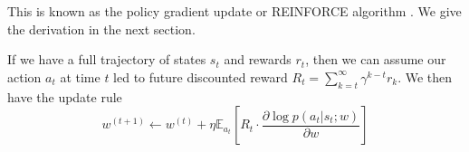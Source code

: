 \documentclass[11pt]{report}
\begin{document}
This is known as the policy gradient update or REINFORCE algorithm \citep{williams1992reinforce}. We give the derivation in the next section.

If we have a full trajectory of states $s_t$ and rewards $r_t$, then we can assume our action $a_t$ at time $t$ led to future discounted reward $R_t = \sum_{k=t}^\infty \gamma^{k-t} r_k$. We then have the update rule
\begin{equation}
\label{eq:reinforce1}
w^{(t+1)} \gets w^{(t)} + \eta \mathbb{E}_{a_t} \left[ R_t \cdot \frac{\partial \log p(a_t | s_t ; w)}{\partial w}  \right]
\end{equation}

%
%

\end{document}
